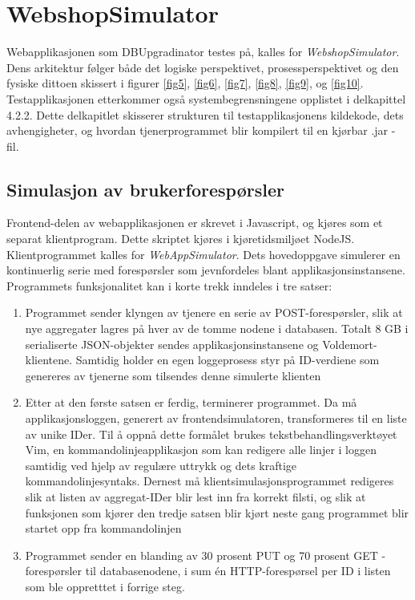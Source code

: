 \section{WebshopSimulator} \label{prog}

Webapplikasjonen som DBUpgradinator testes på, kalles for \emph{WebshopSimulator}. Dens arkitektur følger både det logiske perspektivet, prosess\-perspektivet og den fysiske dittoen skissert i figurer \ref{fig5}, \ref{fig6}, \ref{fig7}, \ref{fig8}, \ref{fig9}, og \ref{fig10}. Testapplikasjonen etterkommer også systembegrensningene opplistet i delkapittel 4.2.2. Dette delkapitlet skisserer strukturen til testapplikasjonens kildekode, dets avhengigheter, og hvordan tjenerprogrammet blir kompilert til en kjørbar .jar - fil.

\subsection{Simulasjon av brukerforespørsler}

Frontend-delen av webapplikasjonen er skrevet i Javascript, og kjøres som et separat klientprogram. Dette skriptet kjøres i kjøretidsmiljøet NodeJS. Klientprogrammet kalles for \emph{WebAppSimulator}. Dets hovedoppgave simulerer en kontinuerlig serie med forespørsler som jevnfordeles blant applikasjonsinstansene. Programmets funksjonalitet kan i korte trekk inndeles i tre satser:

\begin{enumerate}
  \item Programmet sender klyngen av tjenere en serie av POST-forespørsler, slik at nye aggregater lagres på hver av de tomme nodene i databasen. Totalt 8 GB i serialiserte JSON-objekter sendes applikasjonsinstansene og Voldemort-klientene. Samtidig holder en egen loggeprosess styr på ID-verdiene som genereres av tjenerne som tilsendes denne simulerte klienten
  \item Etter at den første satsen er ferdig, terminerer programmet. Da må applikasjonsloggen, generert av frontendsimulatoren, transformeres til en liste av unike IDer. Til å oppnå dette formålet brukes tekstbehandlingsverktøyet Vim, en kommandolinjeapplikasjon som kan redigere alle linjer i loggen samtidig ved hjelp av regulære uttrykk og dets kraftige kommandolinjesyntaks. Dernest må klientsimulasjonsprogrammet redigeres slik at listen av aggregat-IDer blir lest inn fra korrekt filsti, og slik at funksjonen som kjører den tredje satsen blir kjørt neste gang programmet blir startet opp fra kommandolinjen
  \item Programmet sender en blanding av 30 prosent PUT og 70 prosent GET - forespørsler til databasenodene, i sum én HTTP-forespørsel per ID i listen som ble oppretttet i forrige steg.
\end{enumerate}

